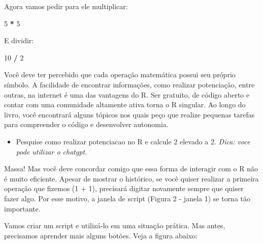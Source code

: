 \documentclass[
]{book}
\newenvironment{Shaded}{\begin{snugshade}}{\end{snugshade}}
\newcommand{\DecValTok}[1]{\textcolor[rgb]{0.00,0.00,0.81}{#1}}
\newcommand{\SpecialCharTok}[1]{\textcolor[rgb]{0.81,0.36,0.00}{\textbf{#1}}}
\providecommand{\tightlist}{%
  \setlength{\itemsep}{0pt}\setlength{\parskip}{0pt}}
\begin{document}
Agora vamos pedir para ele multiplicar:

\begin{Shaded}
\begin{Highlighting}[]
\DecValTok{5} \SpecialCharTok{*} \DecValTok{5}
\end{Highlighting}
\end{Shaded}

E dividir:

\begin{Shaded}
\begin{Highlighting}[]
\DecValTok{10} \SpecialCharTok{/} \DecValTok{2}
\end{Highlighting}
\end{Shaded}

Você deve ter percebido que cada operação matemática possui seu próprio símbolo. A facilidade de encontrar informações, como realizar potenciação, entre outras, na internet é uma das vantagens do R. Ser gratuito, de código aberto e contar com uma comunidade altamente ativa torna o R singular. Ao longo do livro, você encontrará alguns tópicos nos quais peço que realize pequenas tarefas para compreender o código e desenvolver autonomia.

\begin{itemize}
\tightlist
\item
  Pesquise como realizar potenciacao no R e calcule 2 elevado a 2.
  \emph{Dica: voce pode utilizar o chatgpt.}
\end{itemize}

Massa! Mas você deve concordar comigo que essa forma de interagir com o R não é muito eficiente. Apesar de mostrar o histórico, se você quiser realizar a primeira operação que fizemos (1 + 1), precisará digitar novamente sempre que quiser fazer algo. Por esse motivo, a janela de script (Figura 2 - janela 1) se torna tão importante.

Vamos criar um script e utilizá-lo em uma situação prática. Mas antes, precisamos aprender mais alguns botões. Veja a figura abaixo:
\end{document}
